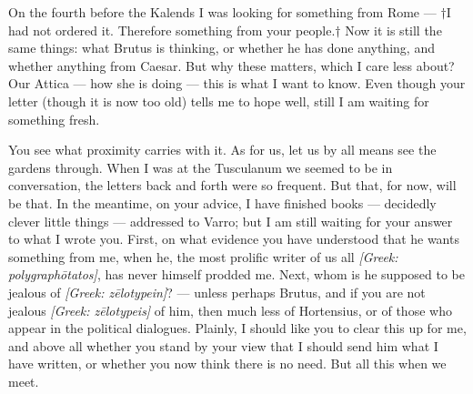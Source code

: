 

 On the fourth before the Kalends I was looking for something from Rome --- $\dagger$I had not ordered it. Therefore something from your people.$\dagger$ Now it is still the same things: what Brutus is thinking, or whether he has done anything, and whether anything from Caesar. But why these matters, which I care less about? Our Attica --- how she is doing --- this is what I want to know. Even though your letter (though it is now too old) tells me to hope well, still I am waiting for something fresh.

 You see what proximity carries with it. As for us, let us by all means see the gardens through. When I was at the Tusculanum we seemed to be in conversation, the letters back and forth were so frequent. But that, for now, will be that. In the meantime, on your advice, I have finished books --- decidedly clever little things --- addressed to Varro; but I am still waiting for your answer to what I wrote you. First, on what evidence you have understood that he wants something from me, when he, the most prolific writer of us all \textit{[Greek: polygraph\=otatos]}, has never himself prodded me. Next, whom is he supposed to be jealous of \textit{[Greek: z\=elotypein]}? --- unless perhaps Brutus, and if you are not jealous \textit{[Greek: z\=elotypeis]} of him, then much less of Hortensius, or of those who appear in the political dialogues. Plainly, I should like you to clear this up for me, and above all whether you stand by your view that I should send him what I have written, or whether you now think there is no need. But all this when we meet.
